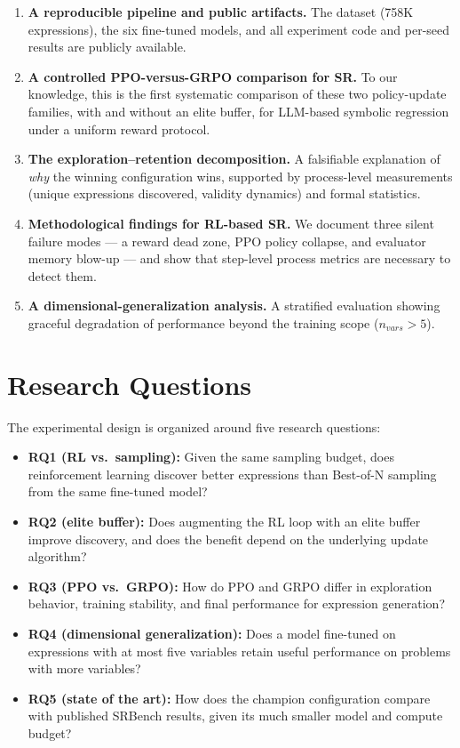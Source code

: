 \begin{enumerate}
    \item \textbf{A reproducible pipeline and public artifacts.} The dataset (758K expressions), the six fine-tuned models, and all experiment code and per-seed results are publicly available.
    \item \textbf{A controlled PPO-versus-GRPO comparison for SR.} To our knowledge, this is the first systematic comparison of these two policy-update families, with and without an elite buffer, for LLM-based symbolic regression under a uniform reward protocol.
    \item \textbf{The exploration--retention decomposition.} A falsifiable explanation of \emph{why} the winning configuration wins, supported by process-level measurements (unique expressions discovered, validity dynamics) and formal statistics.
    \item \textbf{Methodological findings for RL-based SR.} We document three silent failure modes --- a reward dead zone, PPO policy collapse, and evaluator memory blow-up --- and show that step-level process metrics are necessary to detect them.
    \item \textbf{A dimensional-generalization analysis.} A stratified evaluation showing graceful degradation of performance beyond the training scope ($n_{vars} > 5$).
\end{enumerate}

\section{Research Questions}
\label{sec:research_questions}

The experimental design is organized around five research questions:

\begin{itemize}
    \item \textbf{RQ1 (RL vs.\ sampling):} Given the same sampling budget, does reinforcement learning discover better expressions than Best-of-N sampling from the same fine-tuned model?
    \item \textbf{RQ2 (elite buffer):} Does augmenting the RL loop with an elite buffer improve discovery, and does the benefit depend on the underlying update algorithm?
    \item \textbf{RQ3 (PPO vs.\ GRPO):} How do PPO and GRPO differ in exploration behavior, training stability, and final performance for expression generation?
    \item \textbf{RQ4 (dimensional generalization):} Does a model fine-tuned on expressions with at most five variables retain useful performance on problems with more variables?
    \item \textbf{RQ5 (state of the art):} How does the champion configuration compare with published SRBench results, given its much smaller model and compute budget?
\end{itemize}

